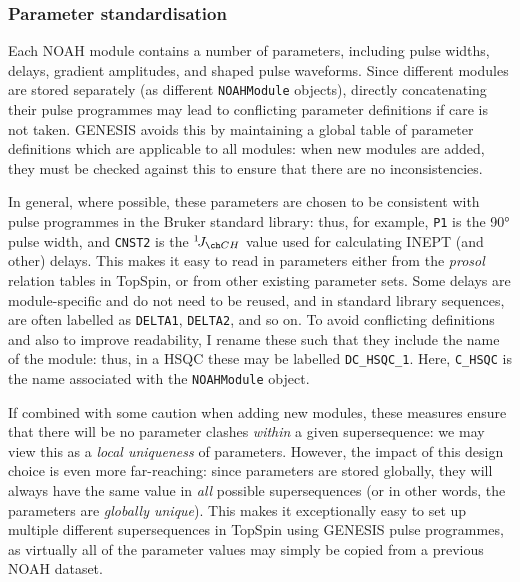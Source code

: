 \subsubsection{Parameter standardisation}

Each NOAH module contains a number of parameters, including pulse widths, delays, gradient amplitudes, and shaped pulse waveforms.
Since different modules are stored separately (as different \texttt{NOAHModule} objects), directly concatenating their pulse programmes may lead to conflicting parameter definitions if care is not taken.
GENESIS avoids this by maintaining a global table of parameter definitions which are applicable to all modules: when new modules are added, they must be checked against this to ensure that there are no inconsistencies.

In general, where possible, these parameters are chosen to be consistent with pulse programmes in the Bruker standard library: thus, for example, \texttt{P1} is the \proton{} \ang{90} pulse width, and \texttt{CNST2} is the $\oneJ{CH}$ value used for calculating INEPT (and other) delays.
This makes it easy to read in parameters either from the \textit{prosol} relation tables in TopSpin, or from other existing parameter sets.
Some delays are module-specific and do not need to be reused, and in standard library sequences, are often labelled as \texttt{DELTA1}, \texttt{DELTA2}, and so on.
To avoid conflicting definitions and also to improve readability, I rename these such that they include the name of the module: thus, in a \carbon{} HSQC these may be labelled \texttt{DC\_HSQC\_1}.
Here, \texttt{C\_HSQC} is the name associated with the \texttt{NOAHModule} object.

If combined with some caution when adding new modules, these measures ensure that there will be no parameter clashes \textit{within} a given supersequence: we may view this as a \textit{local uniqueness} of parameters.
However, the impact of this design choice is even more far-reaching:
since parameters are stored globally, they will always have the same value in \textit{all} possible supersequences (or in other words, the parameters are \textit{globally unique}).
This makes it exceptionally easy to set up multiple different supersequences in TopSpin using GENESIS pulse programmes, as virtually all of the parameter values may simply be copied from a previous NOAH dataset.

